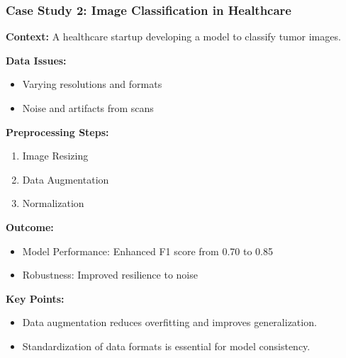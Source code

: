 \documentclass[aspectratio=169]{beamer}
\begin{document}
\begin{frame}[fragile]
    \frametitle{Case Study 2: Image Classification in Healthcare}
    
    \textbf{Context:} A healthcare startup developing a model to classify tumor images.

    \textbf{Data Issues:}
    \begin{itemize}
        \item Varying resolutions and formats
        \item Noise and artifacts from scans
    \end{itemize}

    \textbf{Preprocessing Steps:}
    \begin{enumerate}
        \item Image Resizing
        \item Data Augmentation
        \item Normalization
    \end{enumerate}

    \textbf{Outcome:}
    \begin{itemize}
        \item Model Performance: Enhanced F1 score from 0.70 to 0.85
        \item Robustness: Improved resilience to noise
    \end{itemize}

    \textbf{Key Points:}
    \begin{itemize}
        \item Data augmentation reduces overfitting and improves generalization.
        \item Standardization of data formats is essential for model consistency.
    \end{itemize}
\end{frame}
\end{document}
